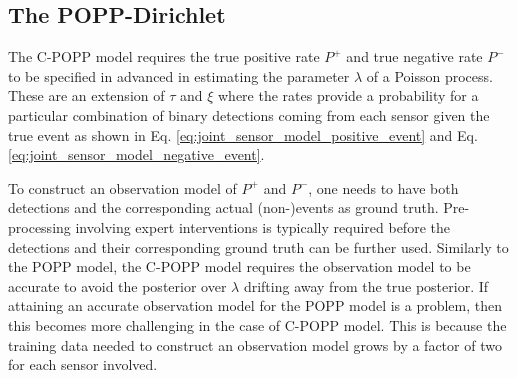 
\subsection{The POPP-Dirichlet}
\label{subsec:popd}

The C-POPP model requires the true positive rate $P^+$ and true negative rate $P^-$ to be specified in advanced in estimating the parameter $\lambda$ of a Poisson process. These are an extension of $\tau$ and $\xi$ where the rates provide a probability for a particular combination of binary detections coming from each sensor given the true event as shown in Eq. \ref{eq:joint_sensor_model_positive_event} and Eq. \ref{eq:joint_sensor_model_negative_event}.

To construct an observation model of $P^+$ and $P^-$, one needs to have both detections and the corresponding actual (non-)events as ground truth. Pre-processing involving expert interventions is typically required before the detections and their corresponding ground truth can be further used. Similarly to the POPP model, the C-POPP model requires the observation model to be accurate to avoid the posterior over $\lambda$ drifting away from the true posterior. If attaining an accurate observation model for the POPP model is a problem, then this becomes more challenging in the case of C-POPP model. This is because the training data needed to construct an observation model grows by a factor of two for each sensor involved.       

